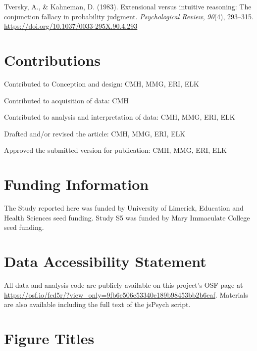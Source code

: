 \documentclass[
  american,
  man,floatsintext]{apa7}
\begin{document}
\leavevmode\hypertarget{ref-tversky_extensional_1983}{}%
Tversky, A., \& Kahneman, D. (1983). Extensional versus intuitive reasoning: The conjunction fallacy in probability judgment. \emph{Psychological Review}, \emph{90}(4), 293--315. \url{https://doi.org/10.1037/0033-295X.90.4.293}



\newpage

\setlength{\parindent}{0.0in}
\setlength{\leftskip}{0.0in}
\setlength{\parskip}{8pt}

\hypertarget{contributions}{%
\section{Contributions}\label{contributions}}

Contributed to Conception and design: CMH, MMG, ERI, ELK

Contributed to acquisition of data: CMH

Contributed to analysis and interpretation of data: CMH, MMG, ERI, ELK

Drafted and/or revised the article: CMH, MMG, ERI, ELK

Approved the submitted version for publication: CMH, MMG, ERI, ELK

\hypertarget{funding-information}{%
\section{Funding Information}\label{funding-information}}

The Study reported here was funded by University of Limerick, Education and Health Sciences seed funding. Study S5 was funded by Mary Immaculate College seed funding.

\hypertarget{data-accessibility-statement}{%
\section{Data Accessibility Statement}\label{data-accessibility-statement}}

All data and analysis code are publicly available on this project's OSF page at \url{https://osf.io/fcd5r/?view_only=9fb6e506e53340c189b98453bb2b6eaf}. Materials are also available including the full text of the jsPsych script.

\hypertarget{figure-titles}{%
\section{Figure Titles}\label{figure-titles}}
\end{document}
